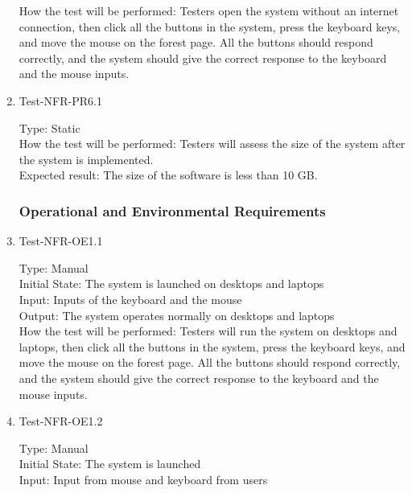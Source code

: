 \documentclass[12pt, titlepage]{article}
\begin{document}
\begin{enumerate}
How the test will be performed: Testers open the system without an internet connection, then click all the buttons in the system, press the keyboard keys, and move the mouse on the forest page. All the buttons should respond correctly, and the system should give the correct response to the keyboard and the mouse inputs. 


\item{Test-NFR-PR6.1\\}

Type: Static\\

How the test will be performed: Testers will assess the size of the system after the system is implemented.\\

Expected result: The size of the software is less than 10 GB.

\subsubsection{Operational and Environmental Requirements}
\item{Test-NFR-OE1.1\\}

Type: Manual\\

Initial State: The system is launched on desktops and laptops\\

Input: Inputs of the keyboard and the mouse\\

Output: The system operates normally on desktops and laptops\\

How the test will be performed: Testers will run the system on desktops and laptops, then click all the buttons in the system, press the keyboard keys, and move the mouse on the forest page. All the buttons should respond correctly, and the system should give the correct response to the keyboard and the mouse inputs. 

\item{Test-NFR-OE1.2\\}

Type: Manual\\

Initial State: The system is launched\\

Input: Input from mouse and keyboard from users\\


\end{enumerate}
\end{document}
